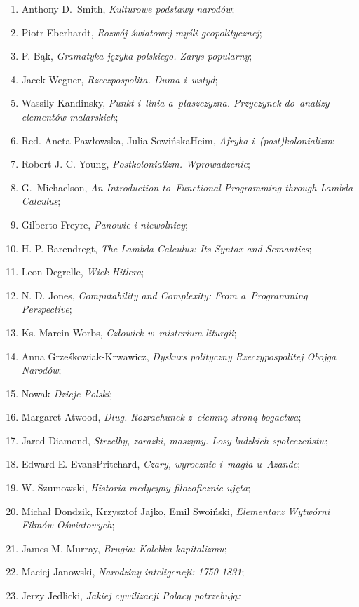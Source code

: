 \documentclass[a4paper,11pt]{article}
\begin{document}
\begin{enumerate}
\item Anthony D.~Smith, \emph{Kulturowe podstawy narodów};
\item Piotr Eberhardt, \emph{Rozwój światowej myśli geopolitycznej};
\item P. Bąk, \emph{Gramatyka języka polskiego. Zarys popularny};
\item Jacek Wegner, \emph{Rzeczpospolita. Duma i~wstyd};
\item Wassily Kandinsky, \emph{Punkt i~linia a~płaszczyzna. Przyczynek
    do~analizy elementów malarskich};
\item Red. Aneta Pawłowska, Julia Sowińska\dywiz Heim, \emph{Afryka
    i~(post)kolonializm};
\item Robert J. C. Young, \emph{Postkolonializm. Wprowadzenie};
\item G.~Michaelson, \emph{An Introduction to~Functional Programming
    through Lambda Calculus};
\item Gilberto Freyre, \emph{Panowie i niewolnicy};
\item H. P. Barendregt, \emph{The Lambda Calculus: Its Syntax and
    Semantics};
\item Leon Degrelle, \emph{Wiek Hitlera};
\item N. D. Jones, \emph{Computability and Complexity: From
    a~Programming Perspective};
\item Ks. Marcin Worbs, \emph{Człowiek w~misterium liturgii};
\item Anna Grześkowiak-Krwawicz, \emph{Dyskurs polityczny
    Rzeczypospolitej Obojga Narodów};
\item Nowak \emph{Dzieje Polski};
\item Margaret Atwood, \emph{Dług. Rozrachunek z~ciemną stroną
    bogactwa};
\item Jared Diamond, \emph{Strzelby, zarazki, maszyny. Losy ludzkich
    społeczeństw};
\item Edward E. Evans\dywiz Pritchard, \emph{Czary, wyrocznie i~magia
    u~Azande};
\item W. Szumowski, \emph{Historia medycyny filozoficznie ujęta};
\item Michał Dondzik, Krzysztof Jajko, Emil Swoiński, \emph{Elementarz
    Wytwórni Filmów Oświatowych};
\item James M. Murray, \emph{Brugia: Kolebka kapitalizmu};
\item Maciej Janowski, \emph{Narodziny inteligencji: 1750-1831};
\item Jerzy Jedlicki, \emph{Jakiej cywilizacji Polacy potrzebują:
}
\end{enumerate}
\end{document}
